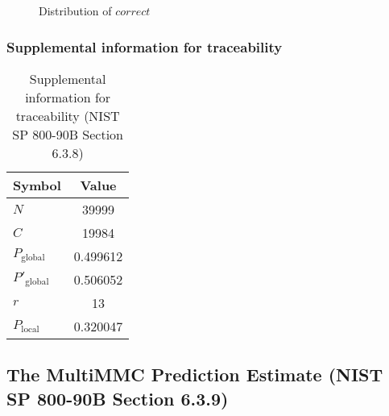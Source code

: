 \documentclass[a3paper,xelatex,english]{bxjsarticle}
\begin{document}
\begin{figure}[htbp]
\centering

\caption{Distribution of $correct$}
\end{figure}
\subsubsection{Supplemental information for traceability}
\renewcommand{\arraystretch}{1.8}
\begin{table}[h]
\caption{Supplemental information for traceability (NIST SP 800-90B Section 6.3.8)}
\begin{center}
\begin{tabular}{|l|c|}
\hline 
\rowcolor{anotherlightblue} %
Symbol				& Value \\ \hline 
$N$				& 39999\\ \hline 
$C$				& 19984\\ \hline 
$P_{\textrm{global}}$				& 0.499612\\ \hline 
$P'_{\textrm{global}}$			& 0.506052\\ \hline 
$r$				& 13\\ \hline 
$P_{\textrm{local}}$ 			& 0.320047\\ \hline
\end{tabular}
\end{center}
\end{table}
\renewcommand{\arraystretch}{1.4}
\clearpage
\subsection{The MultiMMC Prediction Estimate (NIST SP 800-90B Section 6.3.9)}\label{sec:Binary639}
\end{document}
